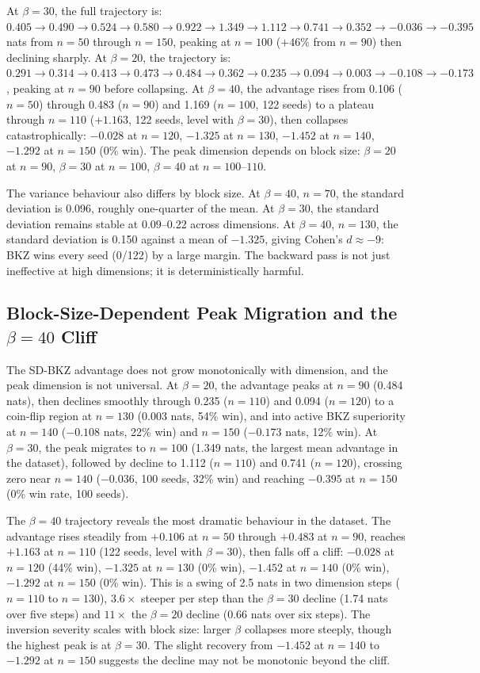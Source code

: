 \documentclass[journal=cic,version=preprint]{iacrj}
\begin{document}
At $\beta=30$, the full trajectory is: $0.405 \to 0.490 \to 0.524 \to 0.580 \to 0.922 \to 1.349 \to 1.112 \to 0.741 \to 0.352 \to -0.036 \to -0.395$ nats from $n=50$ through $n=150$, peaking at $n=100$ ($+46\%$ from $n=90$) then declining sharply. At $\beta=20$, the trajectory is: $0.291 \to 0.314 \to 0.413 \to 0.473 \to 0.484 \to 0.362 \to 0.235 \to 0.094 \to 0.003 \to -0.108 \to -0.173$, peaking at $n=90$ before collapsing. At $\beta=40$, the advantage rises from 0.106 ($n=50$) through 0.483 ($n=90$) and 1.169 ($n=100$, 122 seeds) to a plateau through $n=110$ ($+1.163$, 122 seeds, level with $\beta=30$), then collapses catastrophically: $-0.028$ at $n=120$, $-1.325$ at $n=130$, $-1.452$ at $n=140$, $-1.292$ at $n=150$ (0\% win). The peak dimension depends on block size: $\beta=20$ at $n=90$, $\beta=30$ at $n=100$, $\beta=40$ at $n=100$--$110$.

The variance behaviour also differs by block size. At $\beta=40$, $n=70$, the standard deviation is 0.096, roughly one-quarter of the mean. At $\beta=30$, the standard deviation remains stable at 0.09--0.22 across dimensions. At $\beta=40$, $n=130$, the standard deviation is 0.150 against a mean of $-1.325$, giving Cohen's $d\approx -9$: BKZ wins every seed (0/122) by a large margin. The backward pass is not just ineffective at high dimensions; it is deterministically harmful.

\subsection{Block-Size-Dependent Peak Migration and the $\beta=40$ Cliff}
\label{sec:peakmigration}

The SD-BKZ advantage does not grow monotonically with dimension, and the peak dimension is not universal. At $\beta=20$, the advantage peaks at $n=90$ (0.484 nats), then declines smoothly through 0.235 ($n=110$) and 0.094 ($n=120$) to a coin-flip region at $n=130$ (0.003 nats, 54\% win), and into active BKZ superiority at $n=140$ ($-0.108$ nats, 22\% win) and $n=150$ ($-0.173$ nats, 12\% win). At $\beta=30$, the peak migrates to $n=100$ (1.349 nats, the largest mean advantage in the dataset), followed by decline to 1.112 ($n=110$) and 0.741 ($n=120$), crossing zero near $n=140$ ($-0.036$, 100 seeds, 32\% win) and reaching $-0.395$ at $n=150$ (0\% win rate, 100 seeds).

The $\beta=40$ trajectory reveals the most dramatic behaviour in the dataset. The advantage rises steadily from $+0.106$ at $n=50$ through $+0.483$ at $n=90$, reaches $+1.163$ at $n=110$ (122 seeds, level with $\beta=30$), then falls off a cliff: $-0.028$ at $n=120$ (44\% win), $-1.325$ at $n=130$ (0\% win), $-1.452$ at $n=140$ (0\% win), $-1.292$ at $n=150$ (0\% win). This is a swing of 2.5 nats in two dimension steps ($n=110$ to $n=130$), $3.6\times$ steeper per step than the $\beta=30$ decline (1.74 nats over five steps) and $11\times$ the $\beta=20$ decline (0.66 nats over six steps). The inversion severity scales with block size: larger $\beta$ collapses more steeply, though the highest peak is at $\beta=30$. The slight recovery from $-1.452$ at $n=140$ to $-1.292$ at $n=150$ suggests the decline may not be monotonic beyond the cliff.
\end{document}
